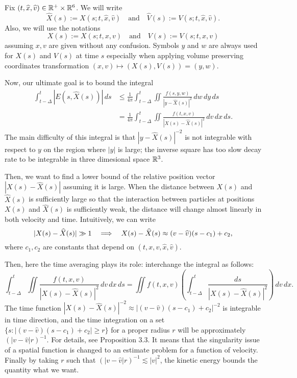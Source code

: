 \documentclass[12pt]{article}
\begin{document}
\begin{notn*}
Fix $(t,\widehat x,\widehat v)\in\mathbb{R}^+\times\mathbb{R}^6$.
We will write
\[\hat X(s):=X(s;t,\hat x,\hat v)\quad\text{and}\quad\hat V(s):=V(s;t,\hat x,\hat v).\]
Also, we will use the notations
\[X(s):=X(s;t,x,v)\quad\text{and}\quad V(s):=V(s;t,x,v)\]
assuming $x,v$ are given without any confusion.
Symbols $y$ and $w$ are always used for $X(s)$ and $V(s)$ at time $s$ especially when applying volume preserving coordinates transformation $(x,v)\mapsto(X(s),V(s))=(y,w)$.
\end{notn*}

Now, our ultimate goal is to bound the integral
\begin{align*}
\int_{t-\Delta}^t|E(s,\hat X(s))|\,ds
&\le\frac1{4\pi}\int_{t-\Delta}^t\iint\frac{f(s,y,w)}{|y-\hat X(s)|^2}\,dw\,dy\,ds\\
&=\frac1{4\pi}\int_{t-\Delta}^t\iint\frac{f(t,x,v)}{|X(s)-\hat X(s)|^2}\,dv\,dx\,ds.
\end{align*}
The main difficulty of this integral is that $|y-\hat X(s)|^{-2}$ is not integrable with respect to $y$ on the region where $|y|$ is large; the inverse square has too slow decay rate to be integrable in three dimesional space $\mathbb{R}^3$.

Then, we want to find a lower bound of the relative position vector $|X(s)-\hat X(s)|$ assuming it is large.
When the distance between $X(s)$ and $\hat X(s)$ is sufficiently large so that the interaction between particles at positions $X(s)$ and $\hat X(s)$ is sufficiently weak, the distance will change almost linearly in both velocity and time.
Intuitively, we can write
\[|X(s)-\hat X(s)|\gg1\impl X(s)-\hat X(s)\approx (v-\hat v)(s-c_1)+c_2,\]
where $c_1,c_2$ are constants that depend on $(t,x,v,\hat x,\hat v)$.

Then, here the time averaging plays its role: interchange the integral as follows:
\[\int_{t-\Delta}^t\iint\frac{f(t,x,v)}{|X(s)-\hat X(s)|^2}\,dv\,dx\,ds=\iint f(t,x,v)\left(\int_{t-\Delta}^t\frac{ds}{|X(s)-\hat X(s)|^2}\right)\,dv\,dx.\]
The time function $|X(s)-\hat X(s)|^{-2}\approx|(v-\hat v)(s-c_1)+c_2|^{-2}$ is integrable in time direction, and the time integration on a set $\{s:|(v-\hat v)(s-c_1)+c_2|\ge r\}$ for a proper radius $r$ will be approximately $(|v-\hat v|r)^{-1}$.
For details, see Proposition 3.3.
It means that the singularity issue of a spatial function is changed to an estimate problem for a function of velocity.
Finally by taking $r$ such that $(|v-\hat v|r)^{-1}\lesssim|v|^2$, the kinetic energy bounds the quantity what we want.
\end{document}

